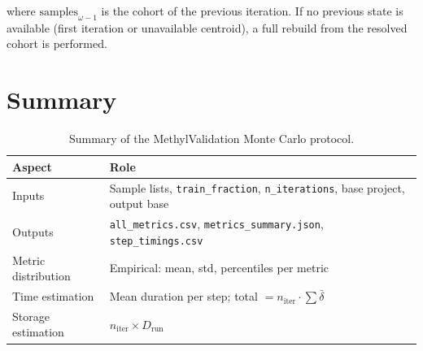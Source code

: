 \documentclass[11pt]{article}
\begin{document}
where $\text{samples}_{\omega-1}$ is the cohort of the previous iteration.
If no previous state is available (first iteration or unavailable centroid),
a full rebuild from the resolved cohort is performed.

\section{Summary}

\begin{table}[h]
\centering
\begin{tabular}{@{}ll@{}}
\toprule
Aspect & Role \\
\midrule
Inputs & Sample lists, \texttt{train\_fraction}, \texttt{n\_iterations},
         base project, output base \\
Outputs & \texttt{all\_metrics.csv}, \texttt{metrics\_summary.json},
          \texttt{step\_timings.csv} \\
Metric distribution & Empirical: mean, std, percentiles per metric \\
Time estimation & Mean duration per step; total $= n_\mathrm{iter} \cdot \sum \bar\delta$ \\
Storage estimation & $n_\mathrm{iter} \times D_\mathrm{run}$ \\
\bottomrule
\end{tabular}
\caption{Summary of the MethylValidation Monte Carlo protocol.}
\end{table}
\end{document}
